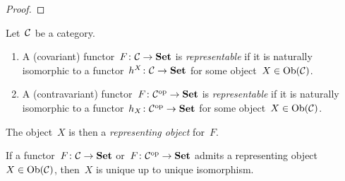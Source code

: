 \begin{proof}
\end{proof}


\begin{definition}
  Let~$\mathcal{C}$ be a category.
  \begin{enumerate}
    \item
      A (covariant) functor~$F \colon \mathcal{C} \to \mathbf{Set}$ is \emph{representable} if it is naturally isomorphic to a functor~$h^X \colon \mathcal{C} \to \mathbf{Set}$ for some object~$X \in \operatorname{Ob}(\mathcal{C})$.
    \item
      A (contravariant) functor~$F \colon \mathcal{C}^{\mathrm{op}} \to \mathbf{Set}$ is \emph{representable} if it is naturally isomorphic to a functor~$h_X \colon \mathcal{C}^{\mathrm{op}} \to \mathbf{Set}$ for some object~$X \in \operatorname{Ob}(\mathcal{C})$.
  \end{enumerate}
  The object~$X$ is then a \emph{representing object} for~$F$.
\end{definition}


\begin{remark*}
  If a functor~$F \colon \mathcal{C} \to \mathbf{Set}$ or~$F \colon \mathcal{C}^{\mathrm{op}} \to \mathbf{Set}$ admits a representing object~$X \in \operatorname{Ob}(\mathcal{C})$, then~$X$ is unique up to unique isomorphism.
\end{remark*}




